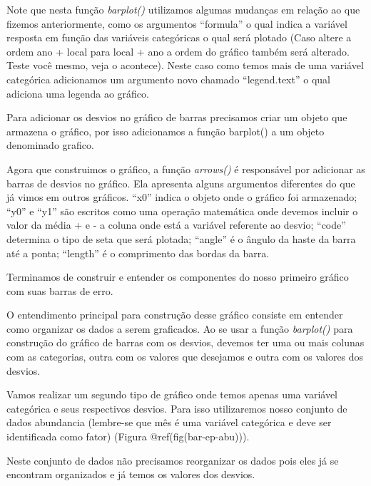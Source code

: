 \documentclass[]{book}
\begin{document}
Note que nesta função \emph{barplot()} utilizamos algumas mudanças em relação ao que fizemos anteriormente, como os argumentos ``formula'' o qual indica a variável resposta em função das variáveis categóricas o qual será plotado (Caso altere a ordem ano + local para local + ano a ordem do gráfico também será alterado. Teste você mesmo, veja o acontece). Neste caso como temos mais de uma variável categórica adicionamos um argumento novo chamado ``legend.text'' o qual adiciona uma legenda ao gráfico.

Para adicionar os desvios no gráfico de barras precisamos criar um objeto que armazena o gráfico, por isso adicionamos a função barplot() a um objeto denominado grafico.

Agora que construimos o gráfico, a função \emph{arrows()} é responsável por adicionar as barras de desvios no gráfico. Ela apresenta alguns argumentos diferentes do que já vimos em outros gráficos. ``x0'' indica o objeto onde o gráfico foi armazenado; ``y0'' e ``y1'' são escritos como uma operação matemática onde devemos incluir o valor da média + e - a coluna onde está a variável referente ao desvio; ``code'' determina o tipo de seta que será plotada; ``angle'' é o ângulo da haste da barra até a ponta; ``length'' é o comprimento das bordas da barra.

Terminamos de construir e entender os componentes do nosso primeiro gráfico com suas barras de erro.

O entendimento principal para construção desse gráfico consiste em entender como organizar os dados a serem graficados. Ao se usar a função \emph{barplot()} para construção do gráfico de barras com os desvios, devemos ter uma ou mais colunas com as categorias, outra com os valores que desejamos e outra com os valores dos desvios.

Vamos realizar um segundo tipo de gráfico onde temos apenas uma variável categórica e seus respectivos desvios. Para isso utilizaremos nosso conjunto de dados abundancia (lembre-se que mês é uma variável categórica e deve ser identificada como fator) (Figura @ref(fig(bar-ep-abu))).

Neste conjunto de dados não precisamos reorganizar os dados pois eles já se encontram organizados e já temos os valores dos desvios.
\end{document}
